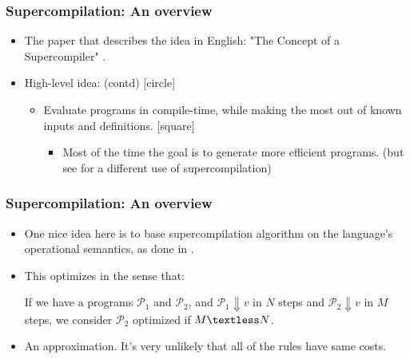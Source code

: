 \documentclass{beamer}
\begin{document}
\begin{frame}

    \frametitle{Supercompilation: An overview}

    \begin{itemize}
        \item
            The paper that describes the idea in English: "The Concept of a
            Supercompiler" \citet{Turchin86theconcept}.
        \item
            High-level idea: (contd)
            [circle]
            \begin{itemize}
                \item
                    Evaluate programs in compile-time, while making the most out
                    of known inputs and definitions.
                    [square]
                    \begin{itemize}[<+->]
                        \item
                            Most of the time the goal is to generate more
                            efficient programs. \newline
                            (but see \citet{Klyuchnikov2010proving} for a
                            different use of supercompilation)
                    \end{itemize}
            \end{itemize}
    \end{itemize}

\end{frame}

\begin{frame}

    \frametitle{Supercompilation: An overview}

    \begin{itemize}[<+->]
        \item
            One nice idea here is to base supercompilation algorithm on the
            language's operational semantics, as done in \citet{SCbyEval}.

        \item
            This optimizes in the sense that:

            If we have a programs $\mathcal{P}_1$ and $\mathcal{P}_2$, and
            \newline
            $\mathcal{P}_1 \Downarrow v$ in $N$ steps and \newline
            $\mathcal{P}_2 \Downarrow v$ in $M$ steps, \newline
            we consider $\mathcal{P}_2$ optimized if $M \textless N$.

        \item
            An approximation. It's very unlikely that all of the rules have same
            costs.
    \end{itemize}

\end{frame}
\end{document}
